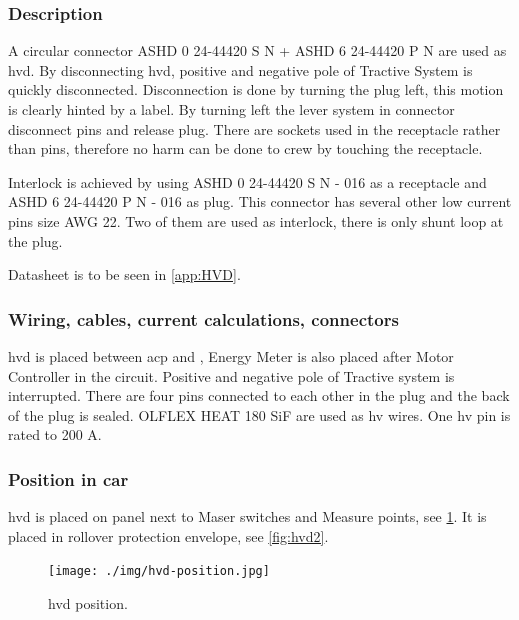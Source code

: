 \subsubsection{Description}

A circular connector ASHD 0 24-44420 S N + ASHD 6 24-44420 P N are used as \gls{hvd}. By disconnecting \gls{hvd}, positive and negative pole of Tractive System is quickly disconnected. Disconnection is done by turning the plug left, this motion is clearly hinted by a label. By turning left the lever system in connector disconnect pins and release plug. There are sockets used in the receptacle rather than pins, therefore no harm can be done to crew by touching the receptacle. 

Interlock is achieved by using ASHD 0 24-44420 S N - 016 as a receptacle and ASHD 6 24-44420 P N - 016 as plug. This connector has several other low current pins size AWG 22. Two of them are used as interlock, there is only shunt loop at the plug.

Datasheet is to be seen in \ref{app:HVD}.

\subsubsection{Wiring, cables, current calculations, connectors}

\gls{hvd} is placed between \acrfull{acp} and , Energy Meter is also placed after Motor Controller in the circuit. Positive and negative pole of Tractive system is interrupted. There are four pins connected to each other in the plug and the back of the plug is sealed. OLFLEX HEAT 180 SiF are used as \gls{hv} wires. One \gls{hv} pin is rated to 200 A.

\subsubsection{Position in car}

\gls{hvd} is placed on panel next to Maser switches and Measure points, see \ref{fig:hvd-position}. It is placed in rollover protection envelope, see \ref{fig:hvd2}.

\begin{figure}[H]
	\centering
	\texttt{[image: ./img/hvd-position.jpg]}
	\caption{\Gls{hvd} position.}
	\label{fig:hvd-position}
\end{figure}

